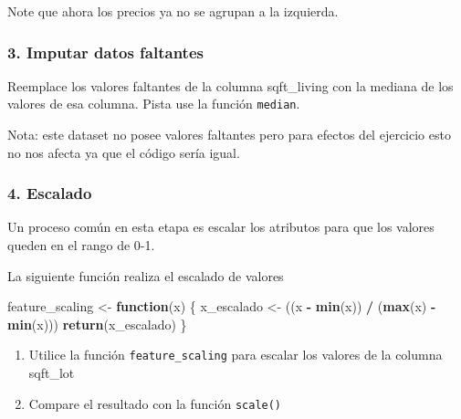 \documentclass[]{article}
\newenvironment{Shaded}{\begin{snugshade}}{\end{snugshade}}
\newcommand{\ControlFlowTok}[1]{\textcolor[rgb]{0.13,0.29,0.53}{\textbf{#1}}}
\newcommand{\KeywordTok}[1]{\textcolor[rgb]{0.13,0.29,0.53}{\textbf{#1}}}
\newcommand{\NormalTok}[1]{#1}
\newcommand{\OperatorTok}[1]{\textcolor[rgb]{0.81,0.36,0.00}{\textbf{#1}}}
\newcommand{\StringTok}[1]{\textcolor[rgb]{0.31,0.60,0.02}{#1}}
\providecommand{\tightlist}{%
  \setlength{\itemsep}{0pt}\setlength{\parskip}{0pt}}
\begin{document}
Note que ahora los precios ya no se agrupan a la izquierda.

\hypertarget{imputar-datos-faltantes}{%
\subsubsection{3. Imputar datos
faltantes}\label{imputar-datos-faltantes}}

Reemplace los valores faltantes de la columna sqft\_living con la
mediana de los valores de esa columna. Pista use la función
\texttt{median}.

Nota: este dataset no posee valores faltantes pero para efectos del
ejercicio esto no nos afecta ya que el código sería igual.

\begin{Shaded}
\end{Shaded}

\hypertarget{escalado}{%
\subsubsection{4. Escalado}\label{escalado}}

Un proceso común en esta etapa es escalar los atributos para que los
valores queden en el rango de 0-1.

La siguiente función realiza el escalado de valores

\begin{Shaded}
\begin{Highlighting}[]
\NormalTok{feature_scaling <-}\StringTok{ }\ControlFlowTok{function}\NormalTok{(x) \{}
\NormalTok{  x_escalado <-}\StringTok{ }\NormalTok{((x }\OperatorTok{-}\StringTok{ }\KeywordTok{min}\NormalTok{(x)) }\OperatorTok{/}\StringTok{ }\NormalTok{(}\KeywordTok{max}\NormalTok{(x) }\OperatorTok{-}\StringTok{ }\KeywordTok{min}\NormalTok{(x)))}
  \KeywordTok{return}\NormalTok{(x_escalado)}
\NormalTok{\}}
\end{Highlighting}
\end{Shaded}

\begin{enumerate}
\def\labelenumi{\arabic{enumi}.}
\tightlist
\item
  Utilice la función \texttt{feature\_scaling} para escalar los valores
  de la columna sqft\_lot
\item
  Compare el resultado con la función \texttt{scale()}
\end{enumerate}
\end{document}
